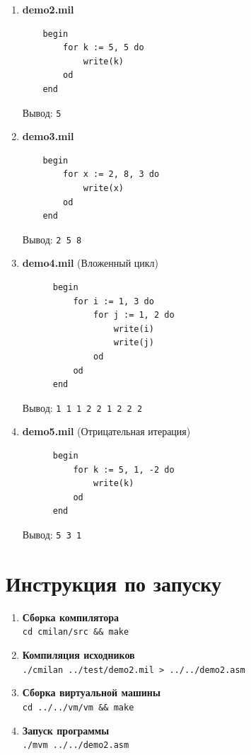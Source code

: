 \documentclass[areasetadvanced]{scrartcl}
\begin{document}
    \begin{enumerate}
      \item \textbf{demo2.mil}
    \begin{lstlisting}
    begin
        for k := 5, 5 do
            write(k)
        od
    end
    \end{lstlisting}
      Вывод: \texttt{5}
    
      \item \textbf{demo3.mil}
    \begin{lstlisting}
    begin
        for x := 2, 8, 3 do
            write(x)
        od
    end
    \end{lstlisting}
      Вывод: \texttt{2 5 8}

      \item \textbf{demo4.mil} (Вложенный цикл)
      \begin{lstlisting}
      begin
          for i := 1, 3 do
              for j := 1, 2 do
                  write(i)
                  write(j)
              od
          od
      end
      \end{lstlisting}
      Вывод: \texttt{1 1 1 2 2 1 2 2 2}

      \item \textbf{demo5.mil} (Отрицательная итерация)
      \begin{lstlisting}
      begin
          for k := 5, 1, -2 do
              write(k)
          od
      end
      \end{lstlisting}
      Вывод: \texttt{5 3 1}
    \end{enumerate}
    \newpage
    \section{Инструкция по запуску}
    
    \begin{enumerate}
      \item \textbf{Сборка компилятора}\\
            \lstinline|cd cmilan/src && make|
      \item \textbf{Компиляция исходников}\\
            \lstinline|./cmilan ../test/demo2.mil > ../../demo2.asm|
      \item \textbf{Сборка виртуальной машины}\\
            \lstinline|cd ../../vm/vm && make|
      \item \textbf{Запуск программы}\\
            \lstinline|./mvm ../../demo2.asm|
    \end{enumerate}
    \newpage
\end{document}
